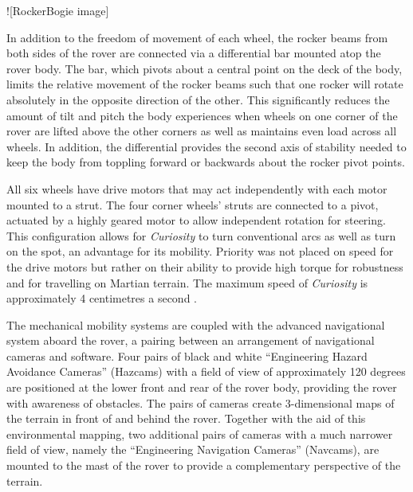         ![RockerBogie image]
        
        In addition to the freedom of movement of each wheel, the rocker beams from both sides of the rover are connected via a differential bar mounted atop the rover body. The bar, which pivots about a central point on the deck of the body, limits the relative movement of the rocker beams such that one rocker will rotate absolutely in the opposite direction of the other. This significantly reduces the amount of tilt and pitch the body experiences when wheels on one corner of the rover are lifted above the other corners as well as maintains even load across all wheels. In addition, the differential provides the second axis of stability needed to keep the body from toppling forward or backwards about the rocker pivot points.
        
        All six wheels have drive motors that may act independently with each motor mounted to a strut. The four corner wheels' struts are connected to a pivot, actuated by a highly geared motor to allow independent rotation for steering. This configuration allows for \textit{Curiosity} to turn conventional arcs as well as turn on the spot, an advantage for its mobility. Priority was not placed on speed for the drive motors but rather on their ability to provide high torque for robustness and for travelling on Martian terrain. The maximum speed of \textit{Curiosity} is approximately 4 centimetres a second \cite{msllegsandwheels}.
        
        The mechanical mobility systems are coupled with the advanced navigational system aboard the rover, a pairing between an arrangement of navigational cameras and software. Four pairs of black and white ``Engineering Hazard Avoidance Cameras'' (Hazcams) with a field of view of approximately 120 degrees are positioned at the lower front and rear of the rover body, providing the rover with awareness of obstacles. The pairs of cameras create 3-dimensional maps of the terrain in front of and behind the rover. Together with the aid of this environmental mapping, two additional pairs of cameras with a much narrower field of view, namely the ``Engineering Navigation Cameras'' (Navcams), are mounted to the mast of the rover to provide a complementary perspective of the terrain.
             

